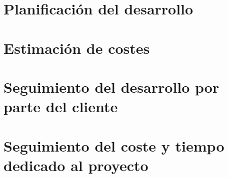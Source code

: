 \section{Planificación del desarrollo}


\section{Estimación de costes}


\section{Seguimiento del desarrollo por parte del cliente}


\section{Seguimiento del coste y tiempo dedicado al proyecto}


